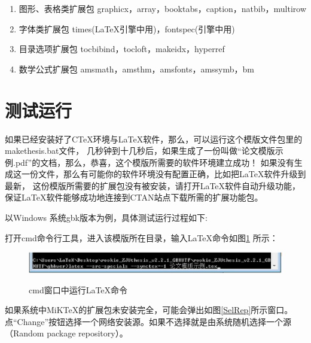 \begin{enumerate}

\item{图形、表格类扩展包} graphicx，array，booktabs，caption，natbib，multirow

\item{字体类扩展包} times(\LaTeX{}引擎中用)，fontspec(\XeTeX{}引擎中用)

\item{目录选项扩展包} tocbibind，tocloft，makeidx，hyperref

\item{数学公式扩展包} amsmath，amsthm，amsfonts，amssymb，bm

\end{enumerate}

\section{测试运行}

如果已经安装好了CTeX环境与\LaTeX 软件，那么，可以运行这个模版文件包里的makethesis.bat文件，
几秒钟到十几秒后，如果生成了一份叫做“论文模版示例.pdf”的文档，那么，恭喜，这个模版所需要的软件环境建立成功！
如果没有生成这一份文件，那么有可能你的软件环境没有配置正确，比如把\LaTeX 软件升级到最新，
这份模版所需要的扩展包没有被安装，请打开\LaTeX 软件自动升级功能，
保证\LaTeX 软件能够成功地连接到CTAN站点下载所需的扩展功能包。

以Windows 系统gbk版本为例，具体测试运行过程如下:

打开cmd命令行工具，进入该模版所在目录，输入\LaTeX 命令如图\ref{runbat} 所示：

\begin{figure}[th]
	\centering
	\includegraphics[scale=0.5]{./Pictures/runbat.eps}\\
	\caption{cmd窗口中运行\LaTeX 命令}
	\label{runbat}
\end{figure}

如果系统中MiKTeX的扩展包未安装完全，可能会弹出如图\ref{SelRep}所示窗口。
点“Change”按钮选择一个网络安装源。如果不选择就是由系统随机选择一个源（Random package repository）。

